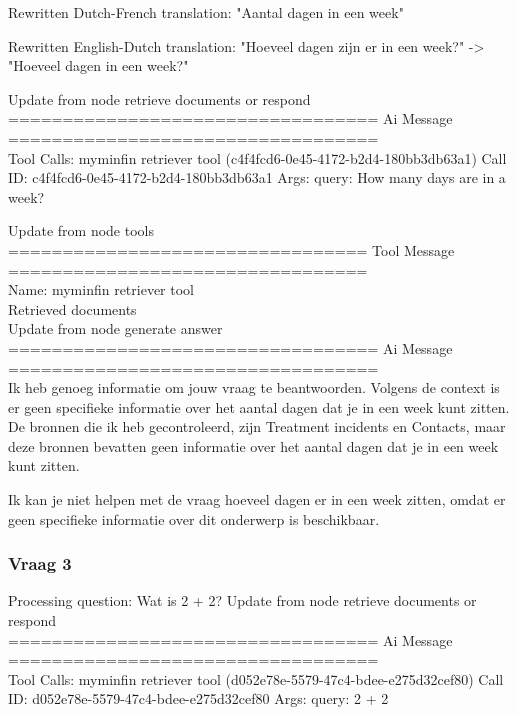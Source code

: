 Rewritten Dutch-French translation:
"Aantal dagen in een week"

Rewritten English-Dutch translation:
"Hoeveel dagen zijn er in een week?" -> "Hoeveel dagen in een week?"



Update from node retrieve  documents  or  respond
\\[1em]
================================== Ai Message ==================================
\\[1em]
Tool Calls:
myminfin  retriever  tool (c4f4fcd6-0e45-4172-b2d4-180bb3db63a1)
Call ID: c4f4fcd6-0e45-4172-b2d4-180bb3db63a1
Args:
query: How many days are in a week?



Update from node tools
\\[1em]
================================= Tool Message =================================
\\[1em]
Name: myminfin  retriever  tool
\\[1em]
Retrieved documents
\\[1em]
Update from node generate  answer
\\[1em]
================================== Ai Message ==================================
\\[1em]

Ik heb genoeg informatie om jouw vraag te beantwoorden. Volgens de context is er geen specifieke informatie over het aantal dagen dat je in een week kunt zitten. De bronnen die ik heb gecontroleerd, zijn Treatment  incidents en Contacts, maar deze bronnen bevatten geen informatie over het aantal dagen dat je in een week kunt zitten.

Ik kan je niet helpen met de vraag hoeveel dagen er in een week zitten, omdat er geen specifieke informatie over dit onderwerp is beschikbaar.


\subsubsection{Vraag 3}
Processing question: Wat is 2 + 2?
Update from node retrieve  documents  or  respond
\\[1em]
================================== Ai Message ==================================
\\[1em]
Tool Calls:
myminfin  retriever  tool (d052e78e-5579-47c4-bdee-e275d32cef80)
Call ID: d052e78e-5579-47c4-bdee-e275d32cef80
Args:
query: 2 + 2



